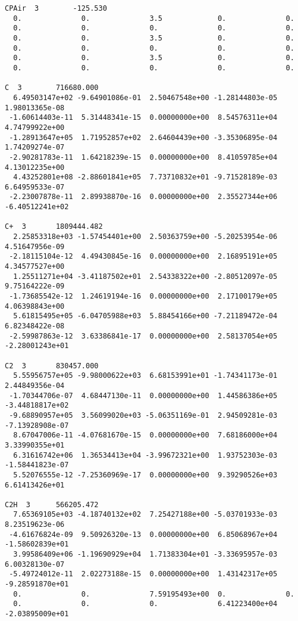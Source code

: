 \begin{verbatim}
CPAir  3		-125.530						 
  0.              0.              3.5             0.              0.            
  0.              0.              0.              0.              0.            
  0.              0.              3.5             0.              0.            
  0.              0.              0.              0.              0.            
  0.              0.              3.5             0.              0.            
  0.              0.              0.              0.              0.            
										 
C  3		716680.000							 
  6.49503147e+02 -9.64901086e-01  2.50467548e+00 -1.28144803e-05  1.98013365e-08
 -1.60614403e-11  5.31448341e-15  0.00000000e+00  8.54576311e+04  4.74799922e+00
 -1.28913647e+05  1.71952857e+02  2.64604439e+00 -3.35306895e-04  1.74209274e-07
 -2.90281783e-11  1.64218239e-15  0.00000000e+00  8.41059785e+04  4.13012235e+00
  4.43252801e+08 -2.88601841e+05  7.73710832e+01 -9.71528189e-03  6.64959533e-07
 -2.23007878e-11  2.89938870e-16  0.00000000e+00  2.35527344e+06 -6.40512241e+02
										 
C+  3		1809444.482							 
  2.25853318e+03 -1.57454401e+00  2.50363759e+00 -5.20253954e-06  4.51647956e-09
 -2.18115104e-12  4.49430845e-16  0.00000000e+00  2.16895191e+05  4.34577527e+00
  1.25511271e+04 -3.41187502e+01  2.54338322e+00 -2.80512097e-05  9.75164222e-09
 -1.73685542e-12  1.24619194e-16  0.00000000e+00  2.17100179e+05  4.06398843e+00
  5.61815495e+05 -6.04705988e+03  5.88454166e+00 -7.21189472e-04  6.82348422e-08
 -2.59987863e-12  3.63386841e-17  0.00000000e+00  2.58137054e+05 -2.28001243e+01
										 
C2  3		830457.000							 
  5.55956757e+05 -9.98000622e+03  6.68153991e+01 -1.74341173e-01  2.44849356e-04
 -1.70344706e-07  4.68447130e-11  0.00000000e+00  1.44586386e+05 -3.44818817e+02
 -9.68890957e+05  3.56099020e+03 -5.06351169e-01  2.94509281e-03 -7.13928908e-07
  8.67047006e-11 -4.07681670e-15  0.00000000e+00  7.68186000e+04  3.33990355e+01
  6.31616742e+06  1.36534413e+04 -3.99672321e+00  1.93752303e-03 -1.58441823e-07
  5.52076555e-12 -7.25360969e-17  0.00000000e+00  9.39290526e+03  6.61413426e+01
										 
C2H  3		566205.472						         
  7.65369105e+03 -4.18740132e+02  7.25427188e+00 -5.03701933e-03  8.23519623e-06
 -4.61676824e-09  9.50926320e-13  0.00000000e+00  6.85068967e+04 -1.58602839e+01
  3.99586409e+06 -1.19690929e+04  1.71383304e+01 -3.33695957e-03  6.00328130e-07
 -5.49724012e-11  2.02273188e-15  0.00000000e+00  1.43142317e+05 -9.28591870e+01
  0.              0.              7.59195493e+00  0.              0.            
  0.              0.              0.              6.41223400e+04 -2.03895009e+01
										 

\end{verbatim}
